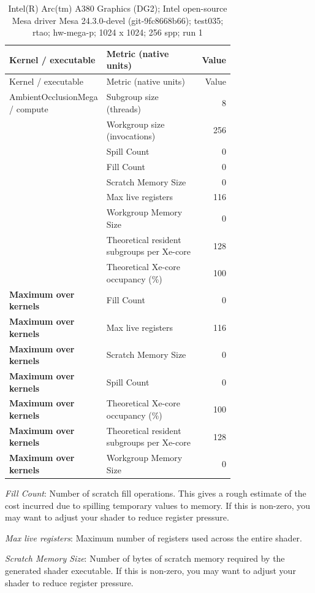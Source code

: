 \begin{longtable}{p{0.30\linewidth}p{0.43\linewidth}r}
\caption{Intel(R) Arc(tm) A380 Graphics (DG2); Intel open-source Mesa driver Mesa 24.3.0-devel (git-9fc8668b66); test035; rtao; hw-mega-p; 1024 x 1024; 256 spp; run 1}\label{tab:hydra-profile-5}\\
\hline Kernel / executable & Metric (native units) & Value \\\hline
\endfirsthead
\hline Kernel / executable & Metric (native units) & Value \\\hline
\endhead
AmbientOcclusionMega / compute & Subgroup size (threads) & 8 \\
 & Workgroup size (invocations) & 256 \\
 & Spill Count & 0 \\
 & Fill Count & 0 \\
 & Scratch Memory Size & 0 \\
 & Max live registers & 116 \\
 & Workgroup Memory Size & 0 \\
 & Theoretical resident subgroups per Xe-core & 128 \\
 & Theoretical Xe-core occupancy (\%) & 100 \\
\hline
\textbf{Maximum over kernels} & Fill Count & 0 \\
\textbf{Maximum over kernels} & Max live registers & 116 \\
\textbf{Maximum over kernels} & Scratch Memory Size & 0 \\
\textbf{Maximum over kernels} & Spill Count & 0 \\
\textbf{Maximum over kernels} & Theoretical Xe-core occupancy (\%) & 100 \\
\textbf{Maximum over kernels} & Theoretical resident subgroups per Xe-core & 128 \\
\textbf{Maximum over kernels} & Workgroup Memory Size & 0 \\
\hline
\end{longtable}
\noindent\textit{Fill Count}: Number of scratch fill operations.  This gives a rough estimate of the cost incurred due to spilling temporary values to memory.  If this is non-zero, you may want to adjust your shader to reduce register pressure.\par
\noindent\textit{Max live registers}: Maximum number of registers used across the entire shader.\par
\noindent\textit{Scratch Memory Size}: Number of bytes of scratch memory required by the generated shader executable.  If this is non-zero, you may want to adjust your shader to reduce register pressure.\par

